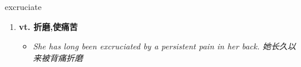 
\begin{frame}
{\huge excruciate}
\begin{center}
\begin{enumerate}\Large
  \item \textbf{vt. 折磨,使痛苦}
  \begin{itemize}
    \item \em{\Large{She has long been excruciated by a persistent pain in her back. 她长久以来被背痛折磨}}
  \end{itemize}
\end{enumerate}
\end{center}
\end{frame}
